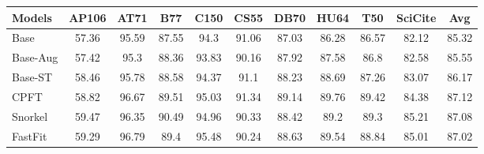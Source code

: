 \begin{table*}[]
\centering
\begin{tabular}{|l|c|c|c|c|c|c|c|c|c|c|}
\hline
\textbf{Models}     & \textbf{AP106}                  & \textbf{AT71}                    & \textbf{B77}   & \textbf{C150}                    & \textbf{CS55}                    & \textbf{DB70}                    & \textbf{HU64}                    & \textbf{T50}                     & \textbf{SciCite}                 & \textbf{Avg}                     \\ \hline
Base                & 57.36                           & 95.59                            & 87.55          & 94.3                             & 91.06                            & 87.03                            & 86.28                            & 86.57                            & 82.12                            & 85.32                            \\ \hline
Base-Aug            & 57.42                           & 95.3                             & 88.36          & 93.83                            & 90.16                            & 87.92                            & 87.58                            & 86.8                             & 82.58                            & 85.55                            \\ \hline
Base-ST             & 58.46                           & 95.78                            & 88.58          & 94.37                            & 91.1                             & 88.23                            & 88.69                            & 87.26                            & 83.07                            & 86.17                            \\ \hline
CPFT                & 58.82                           & 96.67                            & 89.51          & 95.03                            & 91.34                            & 89.14                            & 89.76                            & 89.42                            & 84.38                            & 87.12                            \\ \hline
Snorkel             & 59.47                           & 96.35                            & 90.49          & 94.96                            & 90.33                            & 88.42                            & 89.2                             & 89.3                             & 85.21                            & 87.08                            \\ \hline
FastFit             & 59.29                           & 96.79                            & 89.4           & 95.48                            & 90.24                            & 88.63                            & 89.54                            & 88.84                            & 85.01                            & 87.02                            \\ \hline

\end{tabular}
\end{table*}
